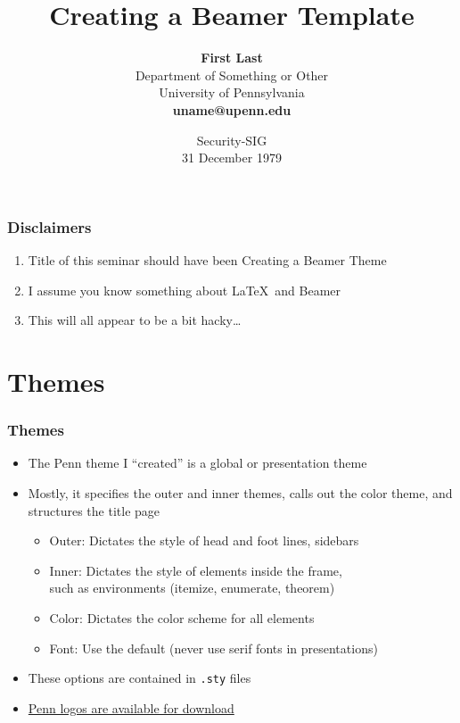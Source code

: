 \documentclass[xcolor=table]{beamer}
\title[Beamer Themes]{\textbf{Creating a Beamer Template}}
\author[F Last]{\textbf{First Last} \\ 
	{\small Department of Something or Other} \\
	{\small University of Pennsylvania} \\
	 \textbf{uname@upenn.edu }}
\institute[uname@upenn.edu]{}
\date[31 December 1979]{Security-SIG \\ 31 December 1979 }
\begin{document}
\frame[plain]{\titlepage}

\setcounter{framenumber}{0}

\begin{frame}
\tableofcontents
\end{frame}

\begin{frame}
\frametitle{Disclaimers}
\begin{enumerate}
\item<1-> Title of this seminar should have been Creating a Beamer Theme
\medskip
\item<2-> I assume you know something about \LaTeX~and Beamer
\medskip
\item<3-> This will all appear to be a bit hacky\ldots
\end{enumerate}
\end{frame}

\section{Themes}
\begin{frame}
\frametitle{Themes}
\begin{itemize}
\item The Penn theme I ``created'' is a \textcolor{quakerblue}{global} or \textcolor{quakerblue}{presentation} theme 
\smallskip
\item Mostly, it specifies the \textcolor{quakerblue}{outer} and \textcolor{quakerblue}{inner} themes, calls out the \textcolor{quakerblue}{color} theme, and structures the title page \\
\begin{itemize}
\item \textcolor{quakerblue}{Outer}: Dictates the style of head and foot lines, sidebars
\item \textcolor{quakerblue}{Inner}: Dictates the style of elements inside the frame, \\ such as environments (itemize, enumerate, theorem)
\item \textcolor{quakerblue}{Color}: Dictates the color scheme for all elements
\item \textcolor{quakerblue}{Font}: Use the default (never use serif fonts in presentations)
\end{itemize}
\smallskip
\item These options are contained in \texttt{.sty} files
\smallskip
\item \href{http://www.upenn.edu/webservices/styleguide/logo.html}{\alert{Penn logos are available for download}}
\end{itemize}
\end{frame}
\end{document}
